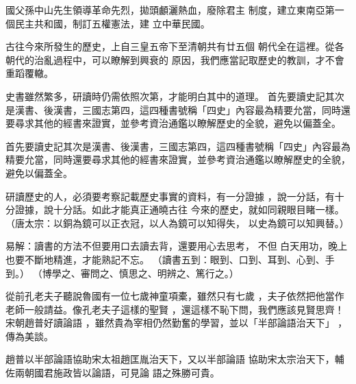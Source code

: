 \documentclass[avery5371,grid]{flashcards}
\begin{document}
{國父孫中山先生領導革命先烈，拋頭顱灑熱血，廢除君主
制度，建立東南亞第一個民主共和國，制訂五權憲法，建
立中華民國。} %
{} %

{古往今來所發生的歷史，上自三皇五帝下至清朝共有廿五個
朝代全在這裡。從各朝代的治亂過程中，可以瞭解到興衰的
原因，我們應當記取歷史的教訓，才不會重蹈覆轍。} %
{} %

{史書雖然繁多，研讀時仍需依照次第，才能明白其中的道理。
首先要讀史記其次是漢書、後漢書，三國志第四，這四種書號稱「四史」內容最為精要允當，同時還要尋求其他的經書來證實，並參考資治通鑑以瞭解歷史的全貌，避免以偏蓋全。} %
{} %

{首先要讀史記其次是漢書、後漢書，三國志第四，這四種書號稱「四史」內容最為精要允當，同時還要尋求其他的經書來證實，並參考資治通鑑以瞭解歷史的全貌，避免以偏蓋全。} %
{} %

{研讀歷史的人，必須要考察記載歷史事實的資料，有一分證據
，說一分話，有十分證據，說十分話。如此才能真正通曉古往
今來的歷史，就如同親眼目睹一樣。} %
{（唐太宗：以銅為鏡可以正衣冠，以人為鏡可以知得失，
以史為鏡可以知興替。）} %






{易解：讀書的方法不但要用口去讀去背，還要用心去思考，
不但 白天用功，晚上也要不斷地精進，才能熟記不忘。} %
{（讀書五到：眼到、口到、耳到、心到、手到。）
（博學之、審問之、慎思之、明辨之、篤行之。）} %

{從前孔老夫子聽說魯國有一位七歲神童項橐，雖然只有七歲
，夫子依然把他當作老師一般請益。像孔老夫子這樣的聖賢
，還這樣不恥下問，我們應該見賢思齊！宋朝趙普好讀論語
，雖然貴為宰相仍然勤奮的學習，並以「半部論語治天下」
，傳為美談。} %
{} %

{趙普以半部論語協助宋太祖趙匡胤治天下，又以半部論語
協助宋太宗治天下，輔佐兩朝國君施政皆以論語，可見論
語之殊勝可貴。} %
{} %
\end{document}
